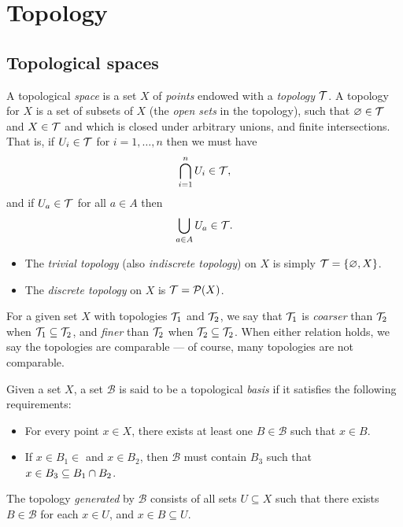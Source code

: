 \setchaptergraphic{}

\chapter{Topology}
\label{ch:topology}

\section{Topological spaces}

\begin{defn}
    A topological \emph{space} is a set $X$ of \emph{points} endowed with a \emph{topology} $\mathcal{T}$. A topology for $X$ is a set of subsets of $X$ (the \emph{open sets} in the topology), such that $\varnothing \in \mathcal{T}$ and $X \in \mathcal{T}$ and which is closed under arbitrary unions, and finite intersections. That is, if $U_i \in \mathcal{T}$ for $i = 1, \ldots, n$ then we must have
    \begin{align*}
        \bigcap_{i=1}^{n}U_i \in \mathcal{T},
    \end{align*}
    and if $U_{a} \in \mathcal{T}$ for all $a \in A$ then
    \begin{align*}
        \bigcup_{a\in A}U_a \in \mathcal{T}.
    \end{align*}
\end{defn}

\begin{exmp}\proofbreak
    \begin{itemize}
        \item The \emph{trivial topology} (also \emph{indiscrete topology}) on $X$ is simply $\mathcal{T} = \{\varnothing, X\}$.
        \item The \emph{discrete topology} on $X$ is $\mathcal{T} = \mathcal{P}(X)$. 
    \end{itemize}
\end{exmp}

\begin{defn}
    For a given set $X$ with topologies $\mathcal{T}_1$ and $\mathcal{T}_2$, we say that $\mathcal{T}_1$ is \emph{coarser} than $\mathcal{T}_2$ when $\mathcal{T}_1 \subseteq \mathcal{T}_2$, and \emph{finer} than $\mathcal{T}_2$ when $\mathcal{T}_2 \subseteq \mathcal{T}_2$. When either relation holds, we say the topologies are comparable ---  of course, many topologies are not comparable.
\end{defn}

\begin{defn}
    Given a set $X$, a set $\mathcal{B}$ is said to be a topological \emph{basis} if it satisfies the following requirements:
    \begin{itemize}
        \item For every point $x \in X$, there exists at least one $B \in \mathcal{B}$ such that $x \in B$.
        \item If $x \in B_1 \in$ and $x \in B_2$, then $\mathcal{B}$ must contain $B_3$ such that $x \in B_3 \subseteq B_1 \cap B_2$.
    \end{itemize}
    The topology \emph{generated} by $\mathcal{B}$ consists of all sets $U \subseteq X$ such that there exists $B \in \mathcal{B}$ for each $x \in U$, and $x \in B \subseteq U$.
\end{defn}

